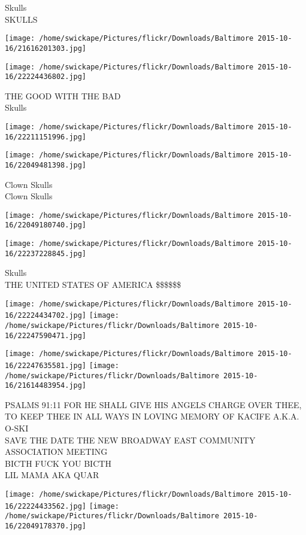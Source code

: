 \documentclass[10pt,letterpaper]{article}
\begin{document}
Skulls\\
SKULLS
\pagebreak

\texttt{[image: /home/swickape/Pictures/flickr/Downloads/Baltimore 2015-10-16/21616201303.jpg]}

\vspace{0.25in}
\texttt{[image: /home/swickape/Pictures/flickr/Downloads/Baltimore 2015-10-16/22224436802.jpg]}

THE GOOD WITH THE BAD\\
Skulls
\pagebreak

\texttt{[image: /home/swickape/Pictures/flickr/Downloads/Baltimore 2015-10-16/22211151996.jpg]}

\vspace{0.25in}
\texttt{[image: /home/swickape/Pictures/flickr/Downloads/Baltimore 2015-10-16/22049481398.jpg]}

Clown Skulls\\
Clown Skulls
\pagebreak

\texttt{[image: /home/swickape/Pictures/flickr/Downloads/Baltimore 2015-10-16/22049180740.jpg]}

\vspace{0.25in}
\texttt{[image: /home/swickape/Pictures/flickr/Downloads/Baltimore 2015-10-16/22237228845.jpg]}

Skulls\\
THE UNITED STATES OF AMERICA \$\$\$\$\$\$
\pagebreak

\texttt{[image: /home/swickape/Pictures/flickr/Downloads/Baltimore 2015-10-16/22224434702.jpg]}
\texttt{[image: /home/swickape/Pictures/flickr/Downloads/Baltimore 2015-10-16/22247590471.jpg]}

\texttt{[image: /home/swickape/Pictures/flickr/Downloads/Baltimore 2015-10-16/22247635581.jpg]}
\texttt{[image: /home/swickape/Pictures/flickr/Downloads/Baltimore 2015-10-16/21614483954.jpg]}

PSALMS 91:11 FOR HE SHALL GIVE HIS ANGELS CHARGE OVER THEE, TO KEEP THEE IN ALL WAYS IN LOVING MEMORY OF KACIFE A.K.A. O{-}SKI\\
SAVE THE DATE THE NEW BROADWAY EAST COMMUNITY ASSOCIATION MEETING\\
BICTH FUCK YOU BICTH\\
LIL MAMA AKA QUAR
\pagebreak

\texttt{[image: /home/swickape/Pictures/flickr/Downloads/Baltimore 2015-10-16/22224433562.jpg]}
\texttt{[image: /home/swickape/Pictures/flickr/Downloads/Baltimore 2015-10-16/22049178370.jpg]}
\end{document}
